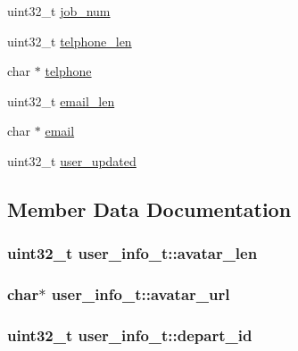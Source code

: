 \begin{DoxyCompactItemize}
\item 
uint32\+\_\+t \hyperlink{structuser__info__t_a8d934ed254a900241f47dc23e3382c55}{job\+\_\+num}
\item 
uint32\+\_\+t \hyperlink{structuser__info__t_a9ab1fbba89de8c007c17f4d7073bed56}{telphone\+\_\+len}
\item 
char $\ast$ \hyperlink{structuser__info__t_a929de0a29e6b92cb6a88692f0bc4a77a}{telphone}
\item 
uint32\+\_\+t \hyperlink{structuser__info__t_aee256930523067afa1e59294abc1be20}{email\+\_\+len}
\item 
char $\ast$ \hyperlink{structuser__info__t_af7eba4fda4451ca5657ba56d4f97cf8f}{email}
\item 
uint32\+\_\+t \hyperlink{structuser__info__t_a48b23d894d4aa082670564dc7231aaeb}{user\+\_\+updated}
\end{DoxyCompactItemize}


\subsection{Member Data Documentation}
\hypertarget{structuser__info__t_aa9ea772df5cf874e213e3c8ab06d8886}{}
\subsubsection[{avatar\+\_\+len}]{\setlength{\rightskip}{0pt plus 5cm}uint32\+\_\+t user\+\_\+info\+\_\+t\+::avatar\+\_\+len}\label{structuser__info__t_aa9ea772df5cf874e213e3c8ab06d8886}
\hypertarget{structuser__info__t_ab6efc5f97c3552b683f4fe22e0f4c152}{}
\subsubsection[{avatar\+\_\+url}]{\setlength{\rightskip}{0pt plus 5cm}char$\ast$ user\+\_\+info\+\_\+t\+::avatar\+\_\+url}\label{structuser__info__t_ab6efc5f97c3552b683f4fe22e0f4c152}
\hypertarget{structuser__info__t_a92a9655fd1734f71e3b51c4ebfd31684}{}
\subsubsection[{depart\+\_\+id}]{\setlength{\rightskip}{0pt plus 5cm}uint32\+\_\+t user\+\_\+info\+\_\+t\+::depart\+\_\+id}\label{structuser__info__t_a92a9655fd1734f71e3b51c4ebfd31684}
\hypertarget{structuser__info__t_af7eba4fda4451ca5657ba56d4f97cf8f}{}
